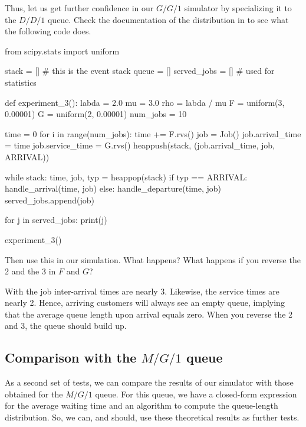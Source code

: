\begin{exercise}
  Thus, let us get further confidence in our $G/G/1$ simulator by specializing it to the $D/D/1$ queue.
  Check the documentation of the  distribution in  to see what the following code does.
  \begin{pyverbatim}
from scipy.stats import uniform

stack = []  # this is the event stack
queue = []
served_jobs = []  # used for statistics


def experiment_3():
    labda = 2.0
    mu = 3.0
    rho = labda / mu
    F = uniform(3, 0.00001)
    G = uniform(2, 0.00001)
    num_jobs = 10

    time = 0
    for i in range(num_jobs):
        time += F.rvs()
        job = Job()
        job.arrival_time = time
        job.service_time = G.rvs()
        heappush(stack, (job.arrival_time, job, ARRIVAL))

    while stack:
        time, job, typ = heappop(stack)
        if typ == ARRIVAL:
            handle_arrival(time, job)
        else:
            handle_departure(time, job)
            served_jobs.append(job)

    for j in served_jobs:
        print(j)


experiment_3()
\end{pyverbatim}

Then use this in our simulation. What happens? What happens if you reverse the 2 and the 3 in $F$ and $G$?
\begin{solution}
  With  the job inter-arrival times are nearly 3.
  Likewise, the service times are nearly 2.
  Hence, arriving customers will always see an empty queue, implying that the average queue length upon arrival equals zero.
  When you reverse the 2 and 3, the queue should build up.
\end{solution}
\end{exercise}


\subsection{Comparison with the $M/G/1$ queue}
\label{sec:comparison-with-mg1}


As a second set of tests, we can compare the results of our simulator with those obtained for the $M/G/1$ queue.
For this queue, we have a closed-form expression for the average waiting time and an algorithm to compute the queue-length distribution.
So, we can, and should, use these theoretical results as further tests.

